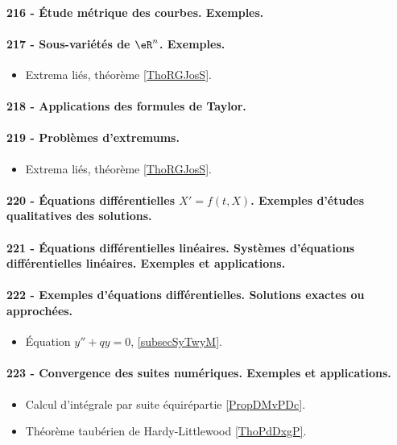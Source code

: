 \paragraph{216 - Étude métrique des courbes. Exemples.}
\paragraph{217 - Sous-variétés de \( \eR^n\). Exemples.}
\begin{itemize}
    \item Extrema liés, théorème \ref{ThoRGJosS}.
\end{itemize}
\paragraph{218 - Applications des formules de Taylor.}
\paragraph{219 - Problèmes d’extremums.}
\begin{itemize}
    \item Extrema liés, théorème \ref{ThoRGJosS}.
\end{itemize}
\paragraph{220 - Équations différentielles $X' = f (t , X )$. Exemples d’études qualitatives des solutions.}
\paragraph{221 - Équations différentielles linéaires. Systèmes d’équations différentielles linéaires. Exemples et applications.}
\paragraph{222 - Exemples d’équations différentielles. Solutions exactes ou approchées.}
\begin{itemize}
    \item Équation \( y''+qy=0\), \ref{subsecSyTwyM}.
\end{itemize}
\paragraph{223 - Convergence des suites numériques. Exemples et applications.}
\begin{itemize}
    \item Calcul d'intégrale par suite équirépartie \ref{PropDMvPDc}.
    \item Théorème taubérien de Hardy-Littlewood \ref{ThoPdDxgP}.
\end{itemize}
